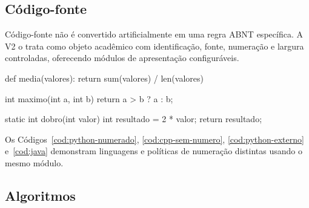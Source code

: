 \subsection{Código-fonte}

Código-fonte não é convertido artificialmente em uma regra ABNT específica. A V2 o trata como objeto acadêmico com identificação, fonte, numeração e largura controladas, oferecendo módulos de apresentação configuráveis.


\lstset{language=Python,numbers=left,stepnumber=1,numbersep=8pt}
\label{cod:python-numerado}
\begin{ufclisting}[here]
def media(valores):
    return sum(valores) / len(valores)
\end{ufclisting}

\lstset{language=C++,numbers=none}
\label{cod:cpp-sem-numero}
\begin{ufclisting}[here]
int maximo(int a, int b) {
    return a > b ? a : b;
}
\end{ufclisting}

\label{cod:python-externo}
\begin{ufcobject}[here]
\end{ufcobject}

\lstset{language=Java,numbers=left,stepnumber=2,numbersep=8pt}
\label{cod:java}
\begin{ufclisting}[here]
static int dobro(int valor) {
    int resultado = 2 * valor;
    return resultado;
}
\end{ufclisting}
\lstset{numbers=none,stepnumber=1}

Os Códigos~\ref{cod:python-numerado}, \ref{cod:cpp-sem-numero}, \ref{cod:python-externo} e~\ref{cod:java} demonstram linguagens e políticas de numeração distintas usando o mesmo módulo.

\subsection{Algoritmos}

